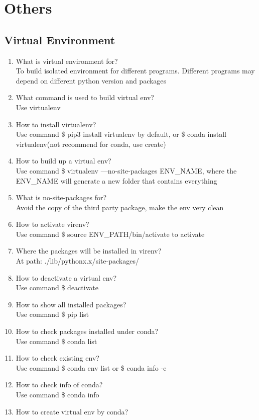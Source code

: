 \documentclass[10pt,a4paper,oneside]{article}
\begin{document}
\section{Others}
\subsection{Virtual Environment}
\begin{enumerate}[1.]
\item What is virtual environment for?\\
To build isolated environment for different programs. Different programs may depend on different python version and packages
\item What command is used to build virtual env?\\
Use virtualenv
\item How to install virtualenv?\\
Use command \$ pip3 install virtualenv by default,  or \$ conda install virtualenv(not recommend for conda, use create)
\item How to build up a virtual env?\\
Use command \$ virtualenv —no-site-packages ENV\_NAME, where the ENV\_NAME will generate a new folder that contains everything
\item What is no-site-packages for?\\
Avoid the copy of the third party package, make the env very clean
\item How to activate virenv?\\
Use command \$ source ENV\_PATH/bin/activate to activate
\item Where the packages will be installed in virenv?\\
At path: ./lib/pythonx.x/site-packages/
\item How to deactivate a virtual env?\\
Use command \$ deactivate
\item How to show all installed packages?\\
Use command \$ pip list
\item How to check packages installed under conda?\\
Use command \$ conda list
\item How to check existing env?\\
Use command \$ conda env list or \$ conda info -e
\item How to check info of conda?\\
Use command \$ conda info
\item How to create virtual env by conda?\\

\end{enumerate}
\end{document}
